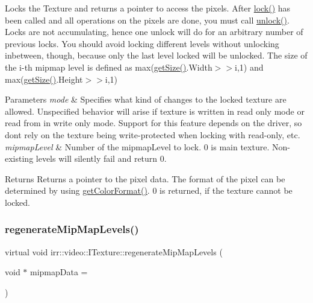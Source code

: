 Locks the Texture and returns a pointer to access the pixels. After \hyperlink{classirr_1_1video_1_1ITexture_aa09ee89973a645ebdd2bd61ed859df38}{lock()} has been called and all operations on the pixels are done, you must call \hyperlink{classirr_1_1video_1_1ITexture_a15b9a25aa18528ade37a492bd7b20a10}{unlock()}. Locks are not accumulating, hence one unlock will do for an arbitrary number of previous locks. You should avoid locking different levels without unlocking inbetween, though, because only the last level locked will be unlocked. The size of the i-\/th mipmap level is defined as max(\hyperlink{classirr_1_1video_1_1ITexture_adfcf9558c0f1ae543782c03f7903c48e}{get\+Size()}.Width$>$$>$i,1) and max(\hyperlink{classirr_1_1video_1_1ITexture_adfcf9558c0f1ae543782c03f7903c48e}{get\+Size()}.Height$>$$>$i,1) 
\begin{DoxyParams}{Parameters}
{\em mode} & Specifies what kind of changes to the locked texture are allowed. Unspecified behavior will arise if texture is written in read only mode or read from in write only mode. Support for this feature depends on the driver, so don\textquotesingle{}t rely on the texture being write-\/protected when locking with read-\/only, etc. \\
\hline
{\em mipmap\+Level} & Number of the mipmap\+Level to lock. 0 is main texture. Non-\/existing levels will silently fail and return 0. \\
\hline
\end{DoxyParams}
\begin{DoxyReturn}{Returns}
Returns a pointer to the pixel data. The format of the pixel can be determined by using \hyperlink{classirr_1_1video_1_1ITexture_a48bbc0208c046724fc3264406f774132}{get\+Color\+Format()}. 0 is returned, if the texture cannot be locked. 
\end{DoxyReturn}
\mbox{\label{classirr_1_1video_1_1ITexture_a9517c37f071479d0698cdf597f8fea45}} 
\subsubsection{\texorpdfstring{regenerate\+Mip\+Map\+Levels()}{regenerateMipMapLevels()}}
{\footnotesize\ttfamily virtual void irr\+::video\+::\+I\+Texture\+::regenerate\+Mip\+Map\+Levels (\begin{DoxyParamCaption}\item[{void $\ast$}]{mipmap\+Data = {} }\end{DoxyParamCaption})\hspace{0.3cm}{\ttfamily [pure virtual]}}



